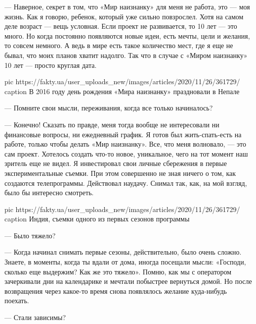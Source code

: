 — Наверное, секрет в том, что «Мир наизнанку» для меня не работа, это — моя
жизнь. Как я говорю, ребенок, который уже сильно повзрослел. Хотя на самом деле
возраст — вещь условная. Если проект не развивается, то 10 лет — это много. Но
когда постоянно появляются новые идеи, есть мечты, цели и желания, то совсем
немного. А ведь в мире есть такое количество мест, где я еще не бывал, что моих
планов хватит надолго. Так что в случае с «Миром наизнанку» 10 лет — просто
круглая дата.

\ifcmt
pic https://fakty.ua/user_uploads_new/images/articles/2020/11/26/361729/%
caption В 2016 году день рождения «Мира наизнанку» праздновали в Непале
\fi


— Помните свои мысли, переживания, когда все только начиналось?

— Конечно! Сказать по правде, меня тогда вообще не интересовали ни финансовые
вопросы, ни ежедневный график. Я готов был жить-спать-есть на работе, только
чтобы делать «Мир наизнанку». Все, что меня волновало, — это сам проект.
Хотелось создать что-то новое, уникальное, чего на тот момент наш зритель еще
не видел. Я инвестировал свои личные сбережения в первые экспериментальные
съемки. При этом совершенно не зная ничего о том, как создаются телепрограммы.
Действовал наудачу. Снимал так, как, на мой взгляд, было бы интересно смотреть.

\ifcmt
pic https://fakty.ua/user_uploads_new/images/articles/2020/11/26/361729/%
caption Индия, съемки одного из первых сезонов программы
\fi

— Было тяжело?

— Когда начинал снимать первые сезоны, действительно, было очень сложно.
Знаете, в моменты, когда ты вдали от дома, иногда посещали мысли:
«Господи, сколько еще выдержим? Как же это тяжело». Помню, как
мы с оператором зачеркивали дни на календарике и мечтали побыстрее
вернуться домой. Но после возвращения через какое-то время снова
появлялось желание куда-нибудь поехать.

— Стали зависимы?

